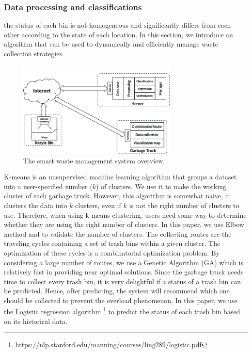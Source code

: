 \documentclass[conference]{IEEEtran}
\begin{document}
\subsubsection{Data processing and classifications}


the status of each bin is not homogeneous and significantly differs from each other according to the state of each location. In this section, we introduce an algorithm that can be used to dynamically and efficiently manage waste collection strategies.
\begin{figure}
	\centering
	\includegraphics[width=8cm]{Model1-2}
	\caption{The smart waste management system overview.}
	\label{fig2}
\end{figure}

\par K-means \cite{Kanungo2003} is an unsupervised machine learning algorithm that groups a dataset into a user-specified number ($k$) of clusters. We use it to make the working cluster of each garbage truck. However, this algorithm is somewhat naive, it clusters the data into $k$ clusters, even if $k$ is not the right number of clusters to use. Therefore, when using k-means clustering, users need some way to determine whether they are using the right number of clusters. In this paper, we use Elbow method \cite{Kodinariya2013} and \cite{Maria2001} to validate the number of clusters. The collecting routes are the traveling cycles containing a set of trash bins within a given cluster. The optimization of these cycles is a combinatorial optimization problem. By considering a large number of routes, we use a Genetic Algorithm (GA) \cite{Gutierrez2008} which is relatively fast in providing near optimal solutions. Since the garbage truck needs time to collect every trash bin, it is very delightful if a status of a trash bin can be predicted. Hence, after predicting, the system will recommend which one should be collected to prevent the overload phenomenon. In this paper, we use the Logistic regression algorithm \footnote{https://nlp.stanford.edu/manning/courses/ling289/logistic.pdf} to predict the status of each trash bin based on its historical data.
\end{document}
